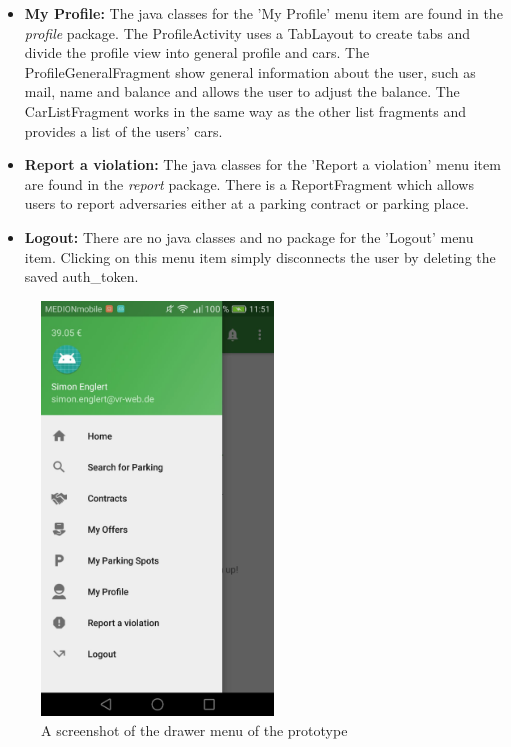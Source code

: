 \begin{itemize}
\item \textbf{My Profile:} The java classes for the 'My Profile' menu item are found in the \textit{profile} package. The ProfileActivity uses a TabLayout to create tabs and divide the profile view into general profile and cars. The ProfileGeneralFragment show general information about the user, such as mail, name and balance and allows the user to adjust the balance. The CarListFragment works in the same way as the other list fragments and provides a list of the users' cars.
\item \textbf{Report a violation:} The java classes for the 'Report a violation' menu item are found in the \textit{report} package. There is a ReportFragment which allows users to report adversaries either at a parking contract or parking place.
\item \textbf{Logout:} There are no java classes and no package for the 'Logout' menu item. Clicking on this menu item simply disconnects the user by deleting the saved auth\_token.
\end{itemize}

\begin{figure}
	\centering
	\includegraphics[height=11cm]{logos/screenshot-menu.png}
	\caption{A screenshot of the drawer menu of the prototype}
	\label{img:screenshot-menu}
\end{figure}


